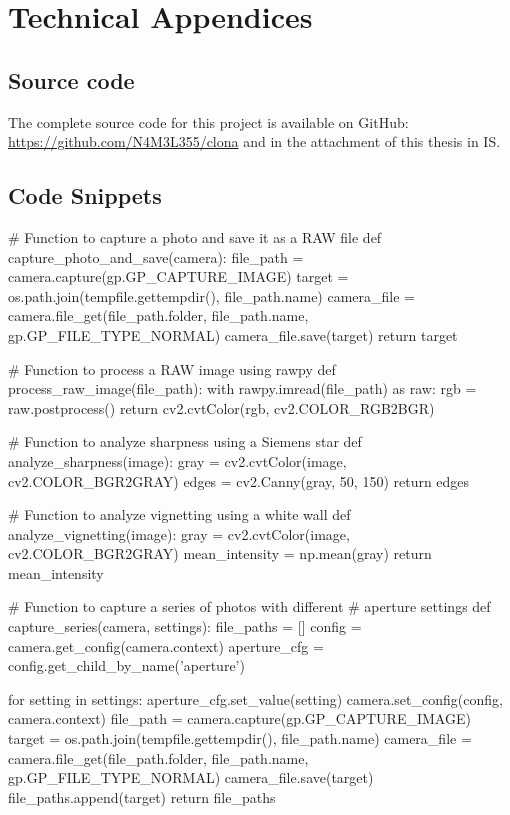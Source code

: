 
\chapter{Technical Appendices}
\section{Source code}
The complete source code for this project is available on GitHub: \url{https://github.com/N4M3L355/clona} and in the attachment of this thesis in IS.

\section{Code Snippets}
\begin{spverbatim}
# Function to capture a photo and save it as a RAW file
def capture_photo_and_save(camera):
    file_path = camera.capture(gp.GP_CAPTURE_IMAGE)
    target = os.path.join(tempfile.gettempdir(), 
                          file_path.name)
    camera_file = camera.file_get(file_path.folder, 
                                  file_path.name, 
                                  gp.GP_FILE_TYPE_NORMAL)
    camera_file.save(target)
    return target

# Function to process a RAW image using rawpy
def process_raw_image(file_path):
    with rawpy.imread(file_path) as raw:
        rgb = raw.postprocess()
    return cv2.cvtColor(rgb, cv2.COLOR_RGB2BGR)

# Function to analyze sharpness using a Siemens star
def analyze_sharpness(image):
    gray = cv2.cvtColor(image, cv2.COLOR_BGR2GRAY)
    edges = cv2.Canny(gray, 50, 150)
    return edges

# Function to analyze vignetting using a white wall
def analyze_vignetting(image):
    gray = cv2.cvtColor(image, cv2.COLOR_BGR2GRAY)
    mean_intensity = np.mean(gray)
    return mean_intensity





# Function to capture a series of photos with different 
# aperture settings
def capture_series(camera, settings):
    file_paths = []
    config = camera.get_config(camera.context)
    aperture_cfg = config.get_child_by_name('aperture')

    for setting in settings:
        aperture_cfg.set_value(setting)
        camera.set_config(config, camera.context)
        file_path = camera.capture(gp.GP_CAPTURE_IMAGE)
        target = os.path.join(tempfile.gettempdir(), 
                              file_path.name)
        camera_file = camera.file_get(file_path.folder,
                                      file_path.name, 
                                      gp.GP_FILE_TYPE_NORMAL)
        camera_file.save(target)
        file_paths.append(target)
    return file_paths
\end{spverbatim}

